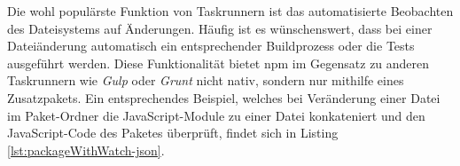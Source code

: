 \begin{figure}[H]
	
\end{figure}

Die wohl populärste Funktion von Taskrunnern ist das automatisierte Beobachten des Dateisystems auf Änderungen. Häufig ist es wünschenswert, dass bei einer Dateiänderung automatisch ein entsprechender Buildprozess oder die Tests ausgeführt werden. Diese Funktionalität bietet npm im Gegensatz zu anderen Taskrunnern wie \textit{Gulp} oder \textit{Grunt} nicht nativ, sondern nur mithilfe eines Zusatzpakets. Ein entsprechendes Beispiel, welches bei Veränderung einer Datei im Paket-Ordner die JavaScript-Module zu einer Datei konkateniert\cite{browserify-about} und den JavaScript-Code des Paketes überprüft, findet sich in Listing \ref{lst:packageWithWatch-json}.\cite{cirkel-npmAsABuildTool}

\begin{figure}[H]
	
\end{figure}
